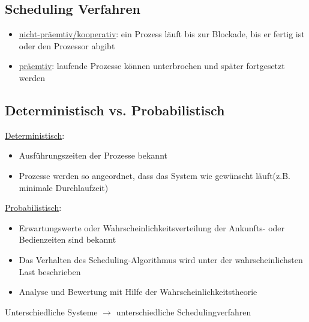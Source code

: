 \documentclass[a4paper]{scrreprt}
\begin{document}
\subsection{Scheduling Verfahren}
\begin{itemize}
\item \underline{nicht-präemtiv/kooperativ}: ein Prozess läuft bis zur Blockade, bis er fertig ist oder den Prozessor abgibt
\item \underline{präemtiv}: laufende Prozesse können unterbrochen und später fortgesetzt werden
\end{itemize}
\subsection{Deterministisch vs. Probabilistisch}
\underline{Deterministisch}:
\begin{itemize}
\item Ausführungszeiten der Prozesse bekannt
\item Prozesse werden so angeordnet, dass das System wie gewünscht läuft(z.B. minimale Durchlaufzeit)
\end{itemize}
\underline{Probabilistisch}:
\begin{itemize}
\item Erwartungswerte oder Wahrscheinlichkeitsverteilung der Ankunfts- oder Bedienzeiten sind bekannt
\item Das Verhalten des Scheduling-Algorithmus wird unter der wahrscheinlichsten Last beschrieben
\item Analyse und Bewertung mit Hilfe der Wahrscheinlichkeitstheorie
\end{itemize}
Unterschiedliche Systeme $\rightarrow$ unterschiedliche Schedulingverfahren
\end{document}
